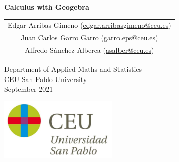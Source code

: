 \begin{titlepage}
\thispagestyle{empty}
\vspace*{7cm}
\par

\begin{center}
\normalfont\fontsize{30}{30}\selectfont
{\bfseries \color{blueceu}Calculus with Geogebra}
\end{center}
\vspace{1cm}

\begin{center}
\Large
\begin{tabular}{c}
Edgar Arribas Gimeno (\url{edgar.arribasgimeno@ceu.es})\\
Juan Carlos Garro Garro (\url{garro.eps@ceu.es})\\
Alfredo Sánchez Alberca (\url{asalber@ceu.es})\\
\end{tabular}

\medskip 
Department of Applied Maths and Statistics\\ CEU San Pablo University\\[1cm]
\medskip 
September 2021

\vspace{1cm}
\includegraphics[height=3cm]{img/logo_uspceu}
\end{center}
\vfill
\end{titlepage}